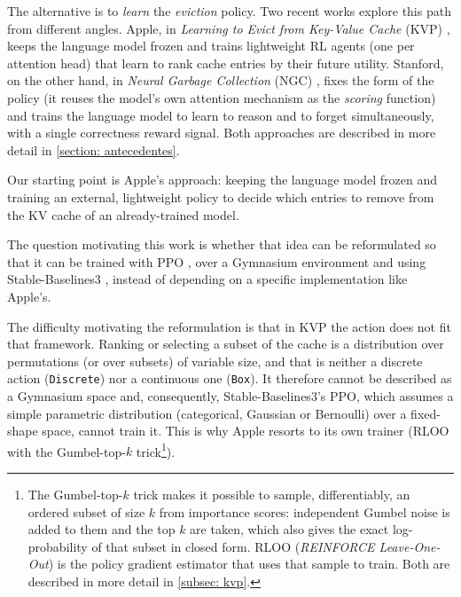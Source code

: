 The alternative is to \emph{learn} the \textit{eviction} policy. Two recent works explore this path from different angles. Apple, in \emph{Learning to Evict from Key-Value Cache} (KVP) \cite{moschella2026kvp}, keeps the language model frozen and trains lightweight RL agents (one per attention head) that learn to rank cache entries by their future utility. Stanford, on the other hand, in \emph{Neural Garbage Collection} (NGC) \cite{li2026ngc}, fixes the form of the policy (it reuses the model's own attention mechanism as the \textit{scoring} function) and trains the language model to learn to reason and to forget simultaneously, with a single correctness reward signal. Both approaches are described in more detail in \cref{section: antecedentes}.

Our starting point is Apple's approach: keeping the language model frozen and training an external, lightweight policy to decide which entries to remove from the KV cache of an already-trained model.

The question motivating this work is whether that idea can be reformulated so that it can be trained with PPO \cite{schulman2017ppo}, over a Gymnasium environment \cite{brockman2016gym} and using Stable-Baselines3 \cite{raffin2021sb3}, instead of depending on a specific implementation like Apple's.

The difficulty motivating the reformulation is that in KVP the action does not fit that framework. Ranking or selecting a subset of the cache is a distribution over permutations (or over subsets) of variable size, and that is neither a discrete action (\texttt{Discrete}) nor a continuous one (\texttt{Box}). It therefore cannot be described as a Gymnasium space and, consequently, Stable-Baselines3's PPO, which assumes a simple parametric distribution (categorical, Gaussian or Bernoulli) over a fixed-shape space, cannot train it. This is why Apple resorts to its own trainer (RLOO with the Gumbel-top-$k$ trick\footnote{The Gumbel-top-$k$ trick makes it possible to sample, differentiably, an ordered subset of size $k$ from importance scores: independent Gumbel noise is added to them and the top $k$ are taken, which also gives the exact log-probability of that subset in closed form. RLOO (\textit{REINFORCE Leave-One-Out}) is the policy gradient estimator that uses that sample to train. Both are described in more detail in \cref{subsec: kvp}.}).

